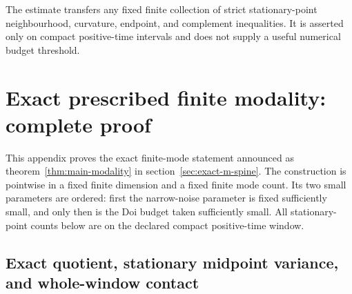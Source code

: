 \documentclass{iopjournal}
\theoremstyle{plain}
\theoremstyle{definition}
\begin{document}
The estimate transfers any fixed finite collection of strict
stationary-point neighbourhood, curvature, endpoint, and complement
inequalities.  It is asserted only on compact positive-time intervals and
does not supply a useful numerical budget threshold.

\section{Exact prescribed finite modality: complete proof}
\label{app:full-proof}

This appendix proves the exact finite-mode statement announced as
theorem~\ref{thm:main-modality} in section~\ref{sec:exact-m-spine}.  The
construction is pointwise in a fixed finite dimension and a fixed finite mode
count.  Its two small parameters are ordered: first the narrow-noise
parameter is fixed sufficiently small, and only then is the Doi budget taken
sufficiently small.  All stationary-point counts below are on the declared
compact positive-time window.

\subsection{Exact quotient, stationary midpoint variance, and whole-window
contact}
\label{subsec:exactmfull-physical}
\end{document}
